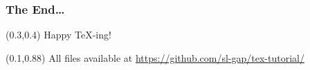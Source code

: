 \documentclass[t,ngerman]{beamer}
\begin{document}
{
\begin{frame}
  \frametitle{The End\dots}
  \begin{textblock}{10}(0.3,0.4)
    {\Huge\color{red}Happy \TeX-ing!}
  \end{textblock}
  \begin{textblock}{10}(0.1,0.88)
    \small All files available at
    \href{https://github.com/sl-gap/tex-tutorial/}{https://github.com/sl-gap/tex-tutorial/}
  \end{textblock}
\end{frame}
}
\end{document}
